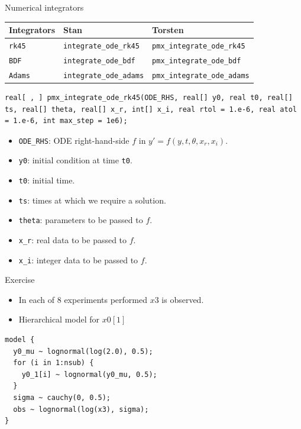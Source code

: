 \documentclass[presentation, allowframebreaks]{beamer}
\begin{document}
\begin{frame}[fragile,label={sec:orgb896000}]{Numerical integrators}
 \begin{center}
\begin{tabular}{lll}
Integrators & Stan & Torsten\\
\hline
\texttt{rk45} & \texttt{integrate\_ode\_rk45} & \texttt{pmx\_integrate\_ode\_rk45}\\
\texttt{BDF} & \texttt{integrate\_ode\_bdf} & \texttt{pmx\_integrate\_ode\_bdf}\\
\texttt{Adams} & \texttt{integrate\_ode\_adams} & \texttt{pmx\_integrate\_ode\_adams}\\
\end{tabular}

\end{center}

\begin{verbatim}
real[ , ] pmx_integrate_ode_rk45(ODE_RHS, real[] y0, real t0, real[] ts, real[] theta, real[] x_r, int[] x_i, real rtol = 1.e-6, real atol = 1.e-6, int max_step = 1e6);
\end{verbatim}
\begin{itemize}
\item \texttt{ODE\_RHS}: ODE right-hand-side \(f\) in \(y' = f(y, t, \theta, x_r, x_i)\).
\item \texttt{y0}: initial condition at time \texttt{t0}.
\item \texttt{t0}: initial time.
\item \texttt{ts}: times at which we require a solution.
\item \texttt{theta}: parameters to be passed to \(f\).
\item \texttt{x\_r}: real data to be passed to \(f\).
\item \texttt{x\_i}: integer data to be passed to \(f\).
\end{itemize}
\end{frame}


\begin{frame}[fragile,label={sec:orgede97b9}]{Exercise}
 \begin{itemize}
\item In each of 8 experiments performed \(x3\) is observed.
\item Hierarchical model for \(x0[1]\)
\end{itemize}
\begin{verbatim}
model {
  y0_mu ~ lognormal(log(2.0), 0.5);
  for (i in 1:nsub) {
    y0_1[i] ~ lognormal(y0_mu, 0.5);    
  }
  sigma ~ cauchy(0, 0.5); 
  obs ~ lognormal(log(x3), sigma);
}
\end{verbatim}
\end{frame}
\end{document}
